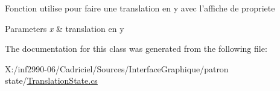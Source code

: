 Fonction utilise pour faire une translation en y avec l'affiche de propriete 


\begin{DoxyParams}{Parameters}
{\em x} & translation en y\\
\hline
\end{DoxyParams}


The documentation for this class was generated from the following file\-:\begin{DoxyCompactItemize}
\item 
X\-:/inf2990-\/06/\-Cadriciel/\-Sources/\-Interface\-Graphique/patron state/\hyperlink{_translation_state_8cs}{Translation\-State.\-cs}\end{DoxyCompactItemize}
